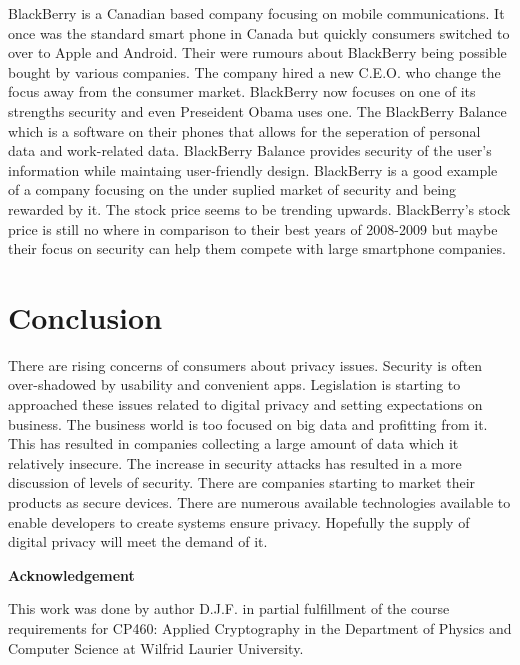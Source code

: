 \documentclass[12pt]{article}
\begin{document}
BlackBerry is a Canadian based company focusing on mobile communications. It once was the standard smart phone in Canada but quickly consumers switched to over to Apple and Android. Their were rumours about BlackBerry being possible bought by various companies. The company hired a new C.E.O. who change the focus away from the consumer market. BlackBerry now focuses on one of its strengths security and even Preseident Obama uses one.\cite{Marks} The BlackBerry Balance which is a software on their phones that allows for the seperation of personal data and work-related data. BlackBerry Balance provides security of the user's information while maintaing user-friendly design. BlackBerry is a good example of a company focusing on the under suplied market of security and being rewarded by it. The stock price seems to be trending upwards. BlackBerry's stock price is still no where in comparison to their best years of 2008-2009 but maybe their focus on security can help them compete with large smartphone companies.


\section{Conclusion}\label{sec:conclusion}
There are rising concerns of consumers about privacy issues. Security is often over-shadowed by usability and convenient apps. Legislation is starting to approached these issues related to digital privacy and setting expectations on business. The business world is too focused on big data and profitting from it. This has resulted in companies collecting a large amount of data which it relatively insecure. The increase in security attacks has resulted in a more discussion of levels of security. There are companies starting to market their products as secure devices. There are numerous available technologies available to enable developers to create systems ensure privacy. Hopefully the supply of digital privacy will meet the demand of it.

\begin{center}
{\bf Acknowledgement}
\end{center}
This work was done by author D.J.F. in partial fulfillment of the course requirements for CP460: Applied Cryptography in the Department of Physics and Computer Science at Wilfrid Laurier University.
\end{document}
